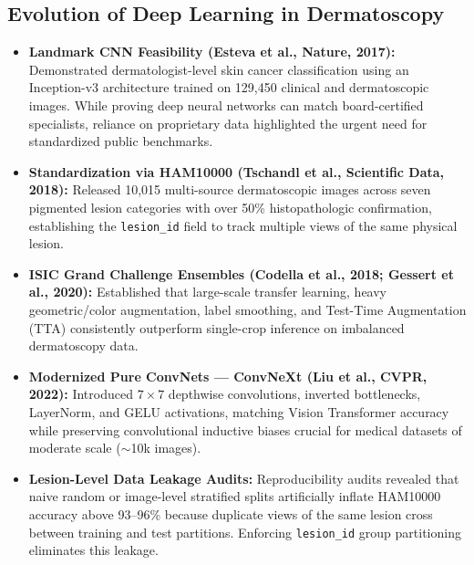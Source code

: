\documentclass[12pt,a4paper]{article}
\begin{document}
\subsection{Evolution of Deep Learning in Dermatoscopy}
\begin{itemize}[leftmargin=*]
    \item \textbf{Landmark CNN Feasibility (Esteva et al., Nature, 2017):} Demonstrated dermatologist-level skin cancer classification using an Inception-v3 architecture trained on 129,450 clinical and dermatoscopic images. While proving deep neural networks can match board-certified specialists, reliance on proprietary data highlighted the urgent need for standardized public benchmarks.
    \item \textbf{Standardization via HAM10000 (Tschandl et al., Scientific Data, 2018):} Released 10,015 multi-source dermatoscopic images across seven pigmented lesion categories with over 50\% histopathologic confirmation, establishing the \texttt{lesion\_id} field to track multiple views of the same physical lesion.
    \item \textbf{ISIC Grand Challenge Ensembles (Codella et al., 2018; Gessert et al., 2020):} Established that large-scale transfer learning, heavy geometric/color augmentation, label smoothing, and Test-Time Augmentation (TTA) consistently outperform single-crop inference on imbalanced dermatoscopy data.
    \item \textbf{Modernized Pure ConvNets --- ConvNeXt (Liu et al., CVPR, 2022):} Introduced $7\times 7$ depthwise convolutions, inverted bottlenecks, LayerNorm, and GELU activations, matching Vision Transformer accuracy while preserving convolutional inductive biases crucial for medical datasets of moderate scale ($\sim$10k images).
    \item \textbf{Lesion-Level Data Leakage Audits:} Reproducibility audits revealed that naive random or image-level stratified splits artificially inflate HAM10000 accuracy above 93--96\% because duplicate views of the same lesion cross between training and test partitions. Enforcing \texttt{lesion\_id} group partitioning eliminates this leakage.
\end{itemize}
\end{document}
